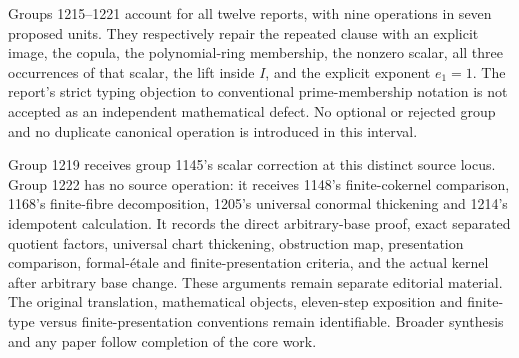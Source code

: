Groups 1215--1221 account for all twelve reports, with nine operations in seven proposed units. They respectively repair the repeated clause with an explicit image, the copula, the polynomial-ring membership, the nonzero scalar, all three occurrences of that scalar, the lift inside \(I\), and the explicit exponent \(e_1=1\). The report's strict typing objection to conventional prime-membership notation is not accepted as an independent mathematical defect. No optional or rejected group and no duplicate canonical operation is introduced in this interval.

Group 1219 receives group 1145's scalar correction at this distinct source locus. Group 1222 has no source operation: it receives 1148's finite-cokernel comparison, 1168's finite-fibre decomposition, 1205's universal conormal thickening and 1214's idempotent calculation. It records the direct arbitrary-base proof, exact separated quotient factors, universal chart thickening, obstruction map, presentation comparison, formal-étale and finite-presentation criteria, and the actual kernel after arbitrary base change. These arguments remain separate editorial material. The original translation, mathematical objects, eleven-step exposition and finite-type versus finite-presentation conventions remain identifiable. Broader synthesis and any paper follow completion of the core work.
